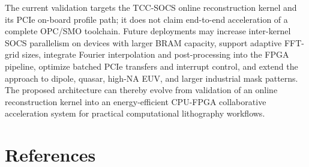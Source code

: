 \documentclass[
  preprint]{elsarticle}
\begin{document}
The current validation targets the TCC-SOCS online reconstruction kernel
and its PCIe on-board profile path; it does not claim end-to-end
acceleration of a complete OPC/SMO toolchain. Future deployments may
increase inter-kernel SOCS parallelism on devices with larger BRAM
capacity, support adaptive FFT-grid sizes, integrate Fourier
interpolation and post-processing into the FPGA pipeline, optimize
batched PCIe transfers and interrupt control, and extend the approach to
dipole, quasar, high-NA EUV, and larger industrial mask patterns. The
proposed architecture can thereby evolve from validation of an online
reconstruction kernel into an energy-efficient CPU-FPGA collaborative
acceleration system for practical computational lithography workflows.

\section{References}\label{references}
\end{document}
